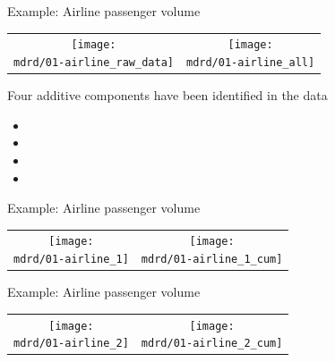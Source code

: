 \begin{frame}{Example: Airline passenger volume}
\newcommand{\wmgd}{0.5\columnwidth}
\newcommand{\hmgd}{3.0cm}
\newcommand{\mdrd}{figures/01-airline}
\newcommand{\mbm}{\hspace{-0.3cm}}
\begin{tabular}{cc}
\mbm \texttt{[image: \\mdrd/01-airline\_raw\_data]} & \texttt{[image: \\mdrd/01-airline\_all]}
\end{tabular}

{\footnotesize
Four additive components have been identified in the data
\begin{itemize}

  \item  

  \item  

  \item  

  \item  

\end{itemize}
}
\end{frame}

\begin{frame}{Example: Airline passenger volume}
\newcommand{\wmgd}{0.5\columnwidth}
\newcommand{\hmgd}{3.0cm}
\newcommand{\mdrd}{figures/01-airline}
\newcommand{\mbm}{\hspace{-0.3cm}}
{\footnotesize

}

\vspace{\baselineskip}

\begin{tabular}{cc}
\mbm \texttt{[image: \\mdrd/01-airline\_1]} & \texttt{[image: \\mdrd/01-airline\_1\_cum]}
\end{tabular}
\end{frame}

\begin{frame}{Example: Airline passenger volume}
\newcommand{\wmgd}{0.5\columnwidth}
\newcommand{\hmgd}{3.0cm}
\newcommand{\mdrd}{figures/01-airline}
\newcommand{\mbm}{\hspace{-0.3cm}}
{\footnotesize

}

\vspace{\baselineskip}

\begin{tabular}{cc}
\mbm \texttt{[image: \\mdrd/01-airline\_2]} & \texttt{[image: \\mdrd/01-airline\_2\_cum]}
\end{tabular}
\end{frame}

